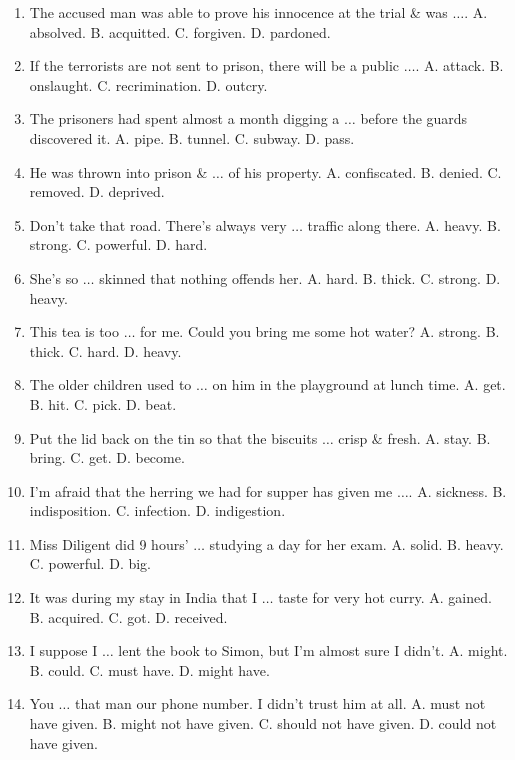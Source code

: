 \documentclass{article}
\numberwithin{equation}{section}
\begin{document}
\begin{enumerate}[leftmargin=2mm]
	\item The accused man was able to prove his innocence at the trial \& was $\ldots$. {\sf A.} absolved. {\sf B.} acquitted. {\sf C.} forgiven. {\sf D.} pardoned.
	\item If the terrorists are not sent to prison, there will be a public $\ldots$. {\sf A.} attack. {\sf B.} onslaught. {\sf C.} recrimination. {\sf D.} outcry.
	\item The prisoners had spent almost a month digging a $\ldots$ before the guards discovered it. {\sf A.} pipe. {\sf B.} tunnel. {\sf C.} subway. {\sf D.} pass.
	\item He was thrown into prison \& $\ldots$ of his property. {\sf A.} confiscated. {\sf B.} denied. {\sf C.} removed. {\sf D.} deprived.
	\item Don't take that road. There's always very $\ldots$ traffic along there. {\sf A.} heavy. {\sf B.} strong. {\sf C.} powerful. {\sf D.} hard.
	\item She's so $\ldots$ skinned that nothing offends her. {\sf A.} hard. {\sf B.} thick. {\sf C.} strong. {\sf D.} heavy.
	\item This tea is too $\ldots$ for me. Could you bring me some hot water? {\sf A.} strong. {\sf B.} thick. {\sf C.} hard. {\sf D.} heavy.
	\item The older children used to $\ldots$ on him in the playground at lunch time. {\sf A.} get. {\sf B.} hit. {\sf C.} pick. {\sf D.} beat.
	\item Put the lid back on the tin so that the biscuits $\ldots$ crisp \& fresh. {\sf A.} stay. {\sf B.} bring. {\sf C.} get. {\sf D.} become.
	\item I'm afraid that the herring we had for supper has given me $\ldots$. {\sf A.} sickness. {\sf B.} indisposition. {\sf C.} infection. {\sf D.} indigestion.
	\item Miss Diligent did 9 hours' $\ldots$ studying a day for her exam. {\sf A.} solid. {\sf B.} heavy. {\sf C.} powerful. {\sf D.} big.
	\item It was during my stay in India that I $\ldots$ taste for very hot curry. {\sf A.} gained. {\sf B.} acquired. {\sf C.} got. {\sf D.} received.
	\item I suppose I $\ldots$ lent the book to Simon, but I'm almost sure I didn't. {\sf A.} might. {\sf B.} could. {\sf C.} must have. {\sf D.} might have.
	\item You $\ldots$ that man our phone number. I didn't trust him at all. {\sf A.} must not have given. {\sf B.} might not have given. {\sf C.} should not have given. {\sf D.} could not have given.

\end{enumerate}
\end{document}
